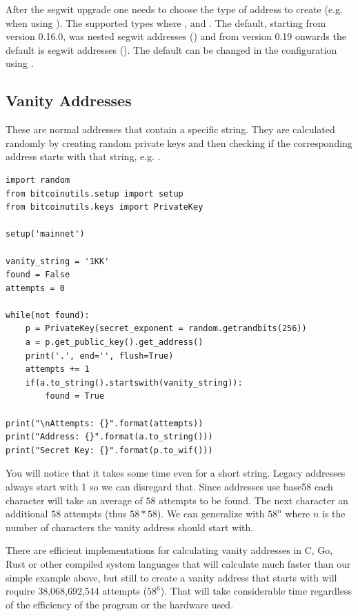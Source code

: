 \begin{note}
	After the segwit upgrade one needs to choose the type of address to create (e.g. when using ). The supported types where ,  and . The default, starting from version 0.16.0, was nested segwit addresses () and from version 0.19 onwards the default is segwit addresses (). The default can be changed in the configuration using .
\end{note}


\subsection*{Vanity Addresses}
These are normal addresses that contain a specific string. They are calculated randomly by creating random private keys and then checking if the corresponding address starts with that string, e.g. .

\vspace{1em}
\begin{lstlisting}[style=Python,label={lst:vanity-address-example},caption={Example of creating a vanity address using Python},captionpos=b]
import random
from bitcoinutils.setup import setup
from bitcoinutils.keys import PrivateKey

setup('mainnet')

vanity_string = '1KK'
found = False
attempts = 0

while(not found):
    p = PrivateKey(secret_exponent = random.getrandbits(256))
    a = p.get_public_key().get_address()
    print('.', end='', flush=True)
    attempts += 1
    if(a.to_string().startswith(vanity_string)):
        found = True

print("\nAttempts: {}".format(attempts))
print("Address: {}".format(a.to_string()))
print("Secret Key: {}".format(p.to_wif()))
\end{lstlisting}
\vspace{1em}

You will notice that it takes some time even for a short string. Legacy addresses always start with 1 so we can disregard that. Since addresses use base58 each character will take an average of $58$ attempts to be found. The next character an additional $58$ attempts (thus $58*58$). We can generalize with $58^{n}$ where $n$ is the number of characters the vanity address should start with. 

There are efficient implementations for calculating vanity addresses in C, Go, Rust or other compiled system languages that will calculate much faster than our simple example above, but still to create a vanity address that starts with  will require 38,068,692,544 attempts ($58^{6}$). That will take considerable time regardless of the efficiency of the program or the hardware used.

